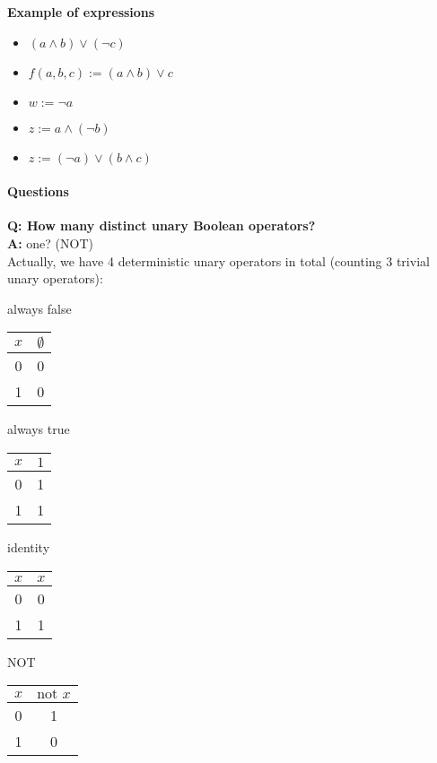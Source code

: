 \documentclass[12pt]{article}
\begin{document}
\textbf{Example of expressions}
\begin{itemize}
    \item $(a \land b) \lor (\lnot c)$
    \item $f(a, b, c) := (a \land b) \lor c$
    \item $w := \lnot a$
    \item $z := a \land (\lnot b)$
    \item $z := (\lnot a) \lor (b \land c)$
\end{itemize}

\paragraph{Questions}
\textbf{Q: How many distinct unary Boolean operators?}\\
\textbf{A:} one? (NOT)\\

Actually, we have 4 deterministic unary operators in total (counting 3 trivial unary operators):\\

\begin{minipage}[t]{0.15\textwidth}
\centering
always false

\begin{tabular}{c|c}
$x$ & $\emptyset$ \\ %
\hline
0 & 0 \\
1 & 0 \\
\end{tabular}
\end{minipage}
\hfill
\begin{minipage}[t]{0.25\textwidth}
\centering
always true

\begin{tabular}{c|c}
$x$ & $1$ \\
\hline
0 & 1 \\
1 & 1 \\
\end{tabular}
\end{minipage}
\hfill
\begin{minipage}[t]{0.25\textwidth}
\centering
identity

\begin{tabular}{c|c}
$x$ & $x$ \\
\hline
0 & 0 \\
1 & 1 \\
\end{tabular}
\end{minipage}
\hfill
\begin{minipage}[t]{0.25\textwidth}
\centering
NOT

\begin{tabular}{c|c}
$x$ & $\text{not } x$ \\
\hline
0 & 1 \\
1 & 0 \\
\end{tabular}
\end{minipage}
\end{document}

